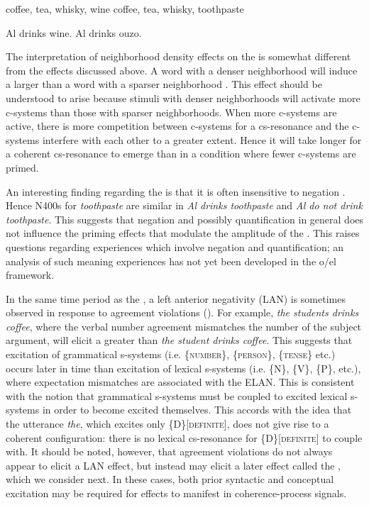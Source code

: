 \ea\label{ex:6:25}
\ea\label{ex:6:25a} coffee, tea, whisky, wine
\ex\label{ex:6:25b}  coffee, tea, whisky, toothpaste
\z
\z

\ea\label{ex:6:26}
\ea\label{ex:6:26a} Al drinks wine.
\ex\label{ex:6:26b} Al drinks ouzo.
\z
\z

  The interpretation of neighborhood density effects on the  is somewhat different from the effects discussed above. A word with a denser neighborhood will induce a larger  than a word with a sparser neighborhood \citep{HolcombEtAl2002,MüllerEtAl2010}. This effect should be understood to arise because stimuli with denser neighborhoods will activate more c-sys\-tems than those with sparser neighborhoods. When more c-sys\-tems are active, there is more competition between c-sys\-tems for a cs-resonance and the c-sys\-tems interfere with each other to a greater extent. Hence it will take longer for a coherent cs-resonance to emerge than in a condition where fewer c-sys\-tems are primed. 

  An interesting finding regarding the  is that it is often insensitive to negation \citep{KutasFedermeier2011}. Hence N400s for \textit{toothpaste} are similar in \textit{Al drinks toothpaste} and \textit{Al do not drink toothpaste}. This suggests that negation and possibly quantification in general does not influence the priming effects that modulate the amplitude of the . This raises questions regarding  experiences which involve negation and quantification; an analysis of such meaning experiences has not yet been developed in the o/el framework.

  In the same time period as the , a left anterior negativity (LAN) is sometimes observed in response to  agreement violations (\citealt{Friederici2002,GunterEtAl2000,KutasFedermeier2011,OsterhoutHolcomb1992}). For example, \textit{the students drinks coffee}, where the verbal number agreement mismatches the number of the subject argument, will elicit a greater  than \textit{the student drinks coffee}. This suggests that excitation of grammatical s-sys\-tems (i.e. \{\textsc{number}\}, \{\textsc{person}\}, \{\textsc{tense}\} etc.) occurs later in time than excitation of lexical s-sys\-tems (i.e. \{N\}, \{V\}, \{P\}, etc.), where expectation mismatches are associated with the ELAN. This is consistent with the notion that grammatical s-sys\-tems must be coupled to excited lexical s-sys\-tems in order to become excited themselves. This accords with the idea that the utterance \textit{the}, which excites only \{D\}[\textsc{definite}], does not give rise to a coherent configuration: there is no lexical cs-resonance for \{D\}[\textsc{definite}] to couple with. It should be noted, however, that agreement violations do not always appear to elicit a LAN effect, but instead may elicit a later effect called the , which we consider next. In these cases, both prior syntactic and conceptual excitation may be required for effects to manifest in coherence-process signals.

